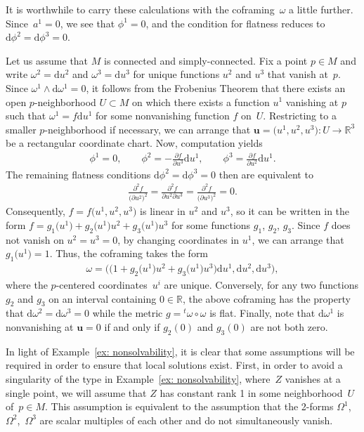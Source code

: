 \documentclass[pdftex]{sigma}
\numberwithin{equation}{section}
\renewcommand{\d}{\mathrm{d}}%
\newcommand{\bbR}{{\mathbb R}}
\newcommand{\mbu}{\mathbf{u}}
\begin{document}
\begin{Example}
It is worthwhile to carry these calculations with the
coframing~$\omega$ a little further. Since~$a^1 = 0$,
we see that $\phi^1 = 0$, and the condition for flatness
reduces to $\d\phi^2 = \d\phi^3 = 0$.

Let us assume that $M$ is connected and simply-connected.
Fix a point $p\in M$ and write $\omega^2 = \d u^2$ and $\omega^3 = \d u^3$
for unique functions $u^2$ and $u^3$ that vanish at~$p$.
Since $\omega^1\wedge\d\omega^1 = 0$, it follows from the Frobenius Theorem that there exists
an open $p$-neighborhood $U\subset M$ on which
there exists a function $u^1$ vanishing at $p$ such that
$\omega^1 = f \d u^1$ for some nonvanishing function $f$ on~$U$.
Restricting to a smaller $p$-neighborhood if necessary, we can
arrange that $\mbu = \big(u^1,u^2,u^3\big)\colon U\to\bbR^3$ be a rectangular coordinate chart.
Now, computation yields
\begin{gather*}
\phi^1 = 0,\qquad \phi^2 = -\frac{\partial f}{\partial u^3} \d u^1,
\qquad \phi^3 = \frac{\partial f}{\partial u^2} \d u^1.
\end{gather*}
The remaining flatness conditions $\d\phi^2 = \d\phi^3 = 0$
then are equivalent to
\begin{gather*}
\frac{\partial^2 f}{\big(\partial u^2\big)^2}
= \frac{\partial^2 f}{\partial u^2\partial u^3}
= \frac{\partial^2 f}{\big(\partial u^3\big)^2} = 0.
\end{gather*}
Consequently, $f = f\big(u^1,u^2,u^3\big)$ is linear in $u^2$ and $u^3$,
so it can be written in the form $f= g_1\big(u^1\big) + g_2\big(u^1\big)u^2+g_3\big(u^1\big)u^3$
for some functions $g_1$, $g_2$, $g_3$. Since $f$ does not vanish
on $u^2 = u^3 = 0$, by changing coordinates in $u^1$, we can arrange
that $g_1\big(u^1\big) = 1$. Thus, the coframing takes the form
\begin{gather*}
\omega = \big( \big(1 + g_2\big(u^1\big)u^2 + g_3\big(u^1\big)u^3\big) \d u^1, \d u^2, \d u^3\big),
\end{gather*}
where the $p$-centered coordinates~$u^i$ are unique. Conversely,
for any two functions $g_2$ and $g_3$ on an interval containing $0\in\bbR$,
the above coframing has the property that $\d\omega^2=\d\omega^3=0$
while the metric $g = {}^t\omega\circ\omega$ is flat. Finally,
note that $\d\omega^1$ is nonvanishing at $\mbu=0$ if and only if $g_2(0)$
and $g_3(0)$ are not both zero.
\end{Example}

In light of Example~\ref{ex: nonsolvability}, it is clear that some assumptions will be required in order to ensure that local solutions exist. First, in order to avoid a singularity of the type in Example~\ref{ex: nonsolvability}, where~$Z$ vanishes at a single point, we will assume that $Z$ has constant rank 1 in some neighborhood~$U$ of~$p \in M$. This assumption is equivalent to the assumption that the 2-forms $\Omega^1$,~$\Omega^2$,~$\Omega^3$ are scalar multiples of each other and do not simultaneously vanish.
\end{document}

